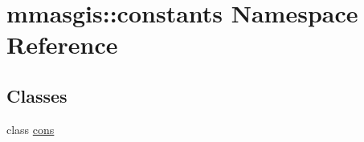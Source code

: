 \hypertarget{namespacemmasgis_1_1constants}{
\section{mmasgis::constants Namespace Reference}
\label{namespacemmasgis_1_1constants}
}
\subsection*{Classes}
\begin{DoxyCompactItemize}
\item 
class \hyperlink{classmmasgis_1_1constants_1_1cons}{cons}
\end{DoxyCompactItemize}
